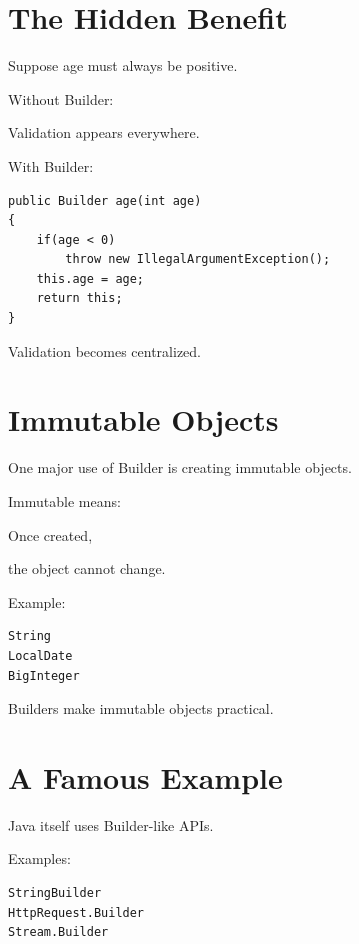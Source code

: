 \documentclass[11pt,a4paper]{book}
\begin{document}

\section{The Hidden Benefit}

Suppose age must always be positive.

Without Builder:

Validation appears everywhere.

With Builder:

\begin{verbatim}
public Builder age(int age)
{
    if(age < 0)
        throw new IllegalArgumentException();
    this.age = age;
    return this;
}
\end{verbatim}

Validation becomes centralized.


\section{Immutable Objects}

One major use of Builder is creating immutable objects.

\begin{idea}

Immutable means:

Once created,

the object cannot change.

\end{idea}

Example:

\begin{verbatim}
String
LocalDate
BigInteger
\end{verbatim}

Builders make immutable objects practical.


\section{A Famous Example}

Java itself uses Builder-like APIs.

Examples:

\begin{verbatim}
StringBuilder
HttpRequest.Builder
Stream.Builder
\end{verbatim}
\end{document}
